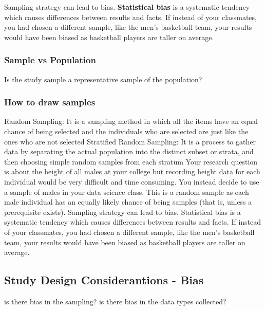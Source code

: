 \documentclass[
]{book}
\begin{document}
Sampling strategy can lead to bias. \textbf{Statistical bias} is a systematic tendency which causes differences between results and facts. If instead of your classmates, you had chosen a different sample, like the men's basketball team, your results would have been biased as basketball players are taller on average.

\hypertarget{sample-vs-population}{%
\subsubsection{Sample vs Population}\label{sample-vs-population}}

Is the study sample a representative sample of the population?

\hypertarget{how-to-draw-samples}{%
\subsubsection{How to draw samples}\label{how-to-draw-samples}}

Random Sampling: It is a sampling method in which all the items have an equal chance of being selected and the individuals who are selected are just like the ones who are not selected
Stratified Random Sampling: It is a process to gather data by separating the actual population into the distinct subset or strata, and then choosing simple random samples from each stratum Your research question is about the height of all males at your college but recording height data for each individual would be very difficult and time consuming. You instead decide to use a sample of males in your data science class. This is a random sample as each male individual has an equally likely chance of being samples (that is, unless a prerequisite exists).
Sampling strategy can lead to bias. Statistical bias is a systematic tendency which causes differences between results and facts. If instead of your classmates, you had chosen a different sample, like the men's basketball team, your results would have been biased as basketball players are taller on average.

\hypertarget{study-design-considerantions---bias}{%
\subsection{Study Design Considerantions - Bias}\label{study-design-considerantions---bias}}

is there bias in the sampling?
is there bias in the data types collected?
\end{document}
